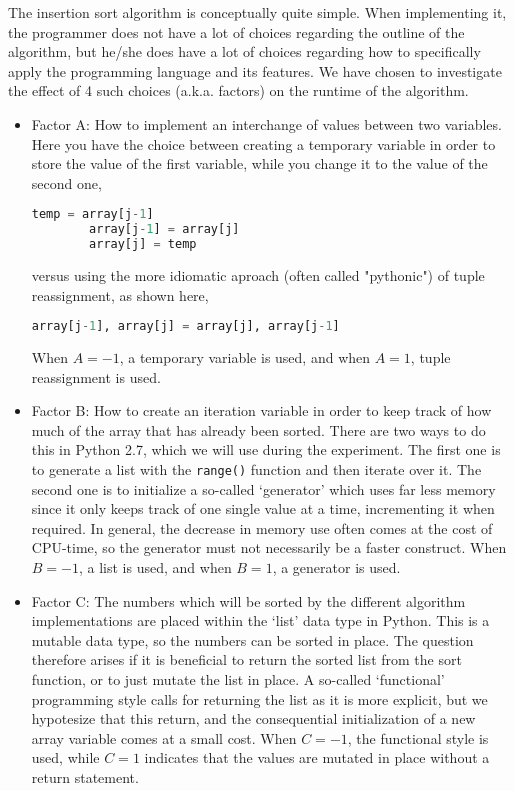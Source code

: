 The insertion sort algorithm is conceptually quite simple. When implementing it, the programmer does not have a lot of choices regarding the outline of the algorithm, but he/she does have a lot of choices regarding how to specifically apply the programming language and its features. We have chosen to investigate the effect of 4 such choices (a.k.a. factors) on the runtime of the algorithm.    

\begin{itemize}
    \item Factor A: How to implement an interchange of values between two variables. Here you have the choice between creating a temporary variable in order to store the value of the first variable, while you change it to the value of the second one,
    \begin{lstlisting}[language=Python]
        temp = array[j-1]
        array[j-1] = array[j]
        array[j] = temp
    \end{lstlisting}
    versus using the more idiomatic aproach (often called "pythonic") of tuple reassignment, as shown here,
    \begin{lstlisting}[language=Python]
        array[j-1], array[j] = array[j], array[j-1]
    \end{lstlisting}
    When $A=-1$, a temporary variable is used, and when $A=1$, tuple reassignment is used.
 
    \item Factor B: How to create an iteration variable in order to keep track of how much of the array that has already been sorted. There are two ways to do this in Python 2.7, which we will use during the experiment. The first one is to generate a list with the \texttt{range()} function and then iterate over it. The second one is to initialize a so-called `generator' which uses far less memory since it only keeps track of one single value at a time, incrementing it when required. In general, the decrease in memory use often comes at the cost of CPU-time, so the generator must not necessarily be a faster construct. When $B=-1$, a list is used, and when $B=1$, a generator is used.
    
    \item Factor C: The numbers which will be sorted by the different algorithm implementations are placed within the `list' data type in Python. This is a mutable data type, so the numbers can be sorted in place. The question therefore arises if it is beneficial to return the sorted list from the sort function, or to just mutate the list in place. A so-called `functional' programming style calls for returning the list as it is more explicit, but we hypotesize that this return, and the consequential initialization of a new array variable comes at a small cost. When $C=-1$, the functional style is used, while $C=1$ indicates that the values are mutated in place without a return statement.
    

\end{itemize}
